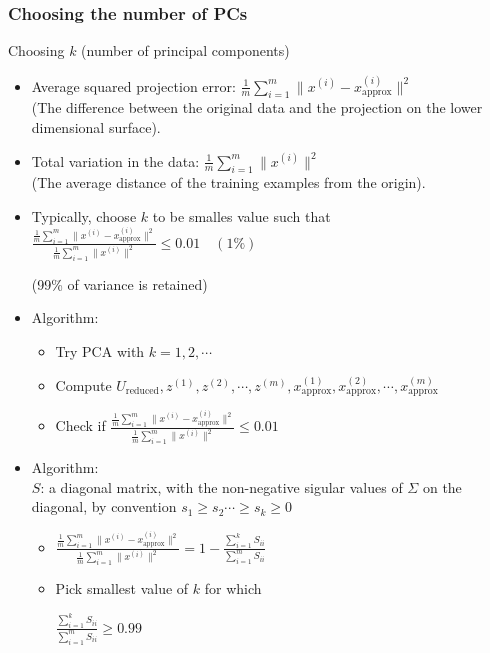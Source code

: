 \subsubsection{Choosing the number of PCs}
Choosing $k$ (number of principal components)
\begin{itemize}
\item[]
Average squared projection error: $\frac{1}{m}\sum_{i=1}^m\|x^{(i)} - x^{(i)}_{\text{approx}}\|^2$\\
(The difference between the original data and the projection on the lower dimensional surface).
\item[]
Total variation in the data: $\frac{1}{m}\sum_{i=1}^m\|x^{(i)}\|^2$\\
(The average distance of the training examples from the origin).
\item[]
Typically, choose $k$ to be smalles value such that\\

$\frac{\frac{1}{m}\sum_{i=1}^m\|x^{(i)} - x^{(i)}_{\text{approx}}\|^2}{\frac{1}{m}\sum_{i=1}^m\|x^{(i)}\|^2} \leq 0.01 \quad (1\%)$

(99\% of variance is retained)\\

\item[]
    Algorithm:
    \begin{itemize}
    \item[]
    Try PCA with $k = 1, 2, \cdots$
    \item[]
    Compute $U_{\text{reduced}}, z^{(1)}, z^{(2)}, \cdots, z^{(m)}, x^{(1)}_\text{approx}, x^{(2)}_\text{approx}, \cdots, x^{(m)}_\text{approx}$
    \item[]
    Check if $\frac{\frac{1}{m}\sum_{i=1}^m\|x^{(i)} - x^{(i)}_{\text{approx}}\|^2}{\frac{1}{m}\sum_{i=1}^m\|x^{(i)}\|^2} \leq 0.01$  
    \end{itemize}
    
\item[]
    Algorithm:\\
    $S$: a diagonal matrix, with the non-negative sigular values of $\Sigma$ on the diagonal, by convention $s_1 \geq s_2 \cdots \geq s_k \geq 0$\\
    \begin{itemize}
    \item[]
    $\frac{\frac{1}{m}\sum_{i=1}^m\|x^{(i)} - x^{(i)}_{\text{approx}}\|^2}{\frac{1}{m}\sum_{i=1}^m\|x^{(i)}\|^2}
    = 1 - \frac{\sum_{i=1}^k{S_{ii}}}{\sum_{i=1}^m{S_{ii}}}$  
    \item[]
    Pick smallest value of $k$ for which
    
    $\frac{\sum_{i=1}^k{S_{ii}}}{\sum_{i=1}^m{S_{ii}}} \geq 0.99$ 
    \end{itemize}
\end{itemize}

